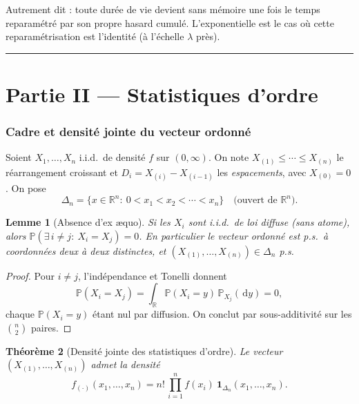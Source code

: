 \documentclass[11pt,a4paper]{article}
\theoremstyle{plain}
\newtheorem{theoreme}{Théorème}[section]
\newtheorem{lemme}[theoreme]{Lemme}
\theoremstyle{definition}
\theoremstyle{remark}
\newcommand{\R}{\mathbb{R}}
\newcommand{\Prob}{\mathbb{P}}
\newcommand{\Xord}[1]{X_{(#1)}}
\newcommand{\dd}{\,\mathrm{d}}
\begin{document}
Autrement dit : toute durée de vie devient sans mémoire une fois le temps
reparamétré par son propre hasard cumulé. L'exponentielle est le cas où cette
reparamétrisation est l'identité (à l'échelle $\lambda$ près).

\begin{center}\rule{0.35\textwidth}{0.4pt}\end{center}
\part*{Partie II --- Statistiques d'ordre}

\section{Cadre et densité jointe du vecteur ordonné}

Soient $X_1,\dots,X_n$ i.i.d.\ de densité $f$ sur $(0,\infty)$. On note
$\Xord{1}\le\cdots\le\Xord{n}$ le réarrangement croissant et
$D_i=\Xord{i}-\Xord{i-1}$ les \emph{espacements}, avec $\Xord0=0$. On pose
\[
\Delta_n=\{x\in\R^n:\ 0<x_1<x_2<\cdots<x_n\}\quad\text{(ouvert de }\R^n).
\]

\begin{lemme}[Absence d'ex \ae quo]\label{lem:ties}
Si les $X_i$ sont i.i.d.\ de loi diffuse (sans atome), alors
$\Prob(\exists\, i\ne j:\ X_i=X_j)=0$. En particulier le vecteur ordonné est
p.s.\ à coordonnées deux à deux distinctes, et $(\Xord1,\dots,\Xord n)\in\Delta_n$ p.s.
\end{lemme}

\begin{proof}
Pour $i\ne j$, l'indépendance et Tonelli donnent
\[
\Prob(X_i=X_j)=\int_\R\Prob(X_i=y)\,\Prob_{X_j}(\dd y)=0,
\]
chaque $\Prob(X_i=y)$ étant nul par diffusion. On conclut par sous-additivité
sur les $\binom n2$ paires.
\end{proof}

\begin{theoreme}[Densité jointe des statistiques d'ordre]\label{th:densite-ordre}
Le vecteur $(\Xord1,\dots,\Xord n)$ admet la densité
\[
f_{(\cdot)}(x_1,\dots,x_n)=n!\,\prod_{i=1}^n f(x_i)\ \mathbf 1_{\Delta_n}(x_1,\dots,x_n).
\]
\end{theoreme}
\end{document}
